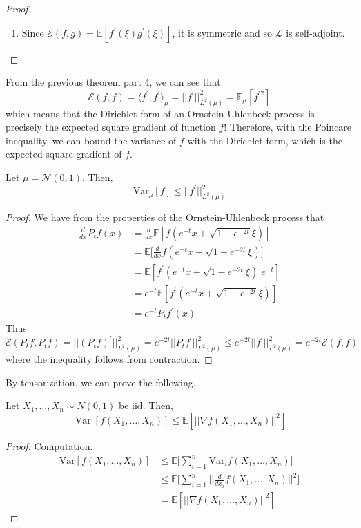 \documentclass{article}
\DeclareMathOperator{\Var}{Var}
\begin{document}
\begin{proof}
\begin{enumerate}
      \item Since $\mathcal{E}(f, g) = \mathbb{E}[f^\prime(\xi) g^\prime (\xi)]$, it is symmetric and so $\mathscr{L}$ is self-adjoint. 
  \end{enumerate}

  \end{proof}

  From the previous theorem part 4, we can see that 
  \[\mathcal{E}(f, f) = \langle f^\prime, f^\prime \rangle_\mu = ||f^\prime||_{L^2(\mu)}^2 = \mathbb{E}_\mu[ f^{\prime 2} ]\]
  which means that the Dirichlet form of an Ornstein-Uhlenbeck process is precisely the expected square gradient of function $f$! Therefore, with the Poincare inequality, we can bound the variance of $f$ with the Dirichlet form, which is the expected square gradient of $f$. 

  \begin{theorem}
  Let $\mu = \mathcal{N}(0, 1)$. Then, 
  \[\mathrm{Var}_\mu [f] \leq ||f^\prime||_{L^2(\mu)}^2\]
  \end{theorem}
  \begin{proof}
  We have from the properties of the Ornstein-Uhlenbeck process that
  \begin{align*}
      \frac{d}{dx} P_t f(x) & = \frac{d}{dx} \mathbb{E}[ f(e^{-t} x + \sqrt{1 - e^{-2t}} \xi)] \\
      & = \mathbb{E} \bigg[ \frac{d}{dx} f(e^{-t} x + \sqrt{1 - e^{-2t}} \xi)] \\
      & = \mathbb{E}[f^\prime (e^{-t} x + \sqrt{1 - e^{-2t}} \xi) \; e^{-t}] \\
      & = e^{-t} \mathbb{E}[f^\prime (e^{-t} x + \sqrt{1 - e^{-2t}} \xi)] \\
      & = e^{-t} P_t f^\prime (x) 
  \end{align*}
  Thus
  \[\mathcal{E}(P_t f, P_t f) = ||(P_t f)^\prime||_{L^2 (\mu)}^2 = e^{-2t} || P_t f^\prime ||^2_{L^2(\mu)} \leq e^{-2t} ||f^\prime||^2_{L^2(\mu)} = e^{-2t} \mathcal{E}(f, f) \]
  where the inequality follows from contraction. 
  \end{proof}

  By tensorization, we can prove the following. 

  \begin{corollary}
  Let $X_1, \ldots, X_n \sim N(0, 1)$ be iid. Then, 
  \[\Var[ f(X_1, \ldots, X_n)] \leq \mathbb{E}[ || \nabla f (X_1, \ldots, X_n)||^2 ]\]
  \end{corollary}
  \begin{proof}
  Computation. 
  \begin{align*}
      \mathrm{Var}[f(X_1, \ldots, X_n)] & \leq \mathbb{E} \bigg[ \sum_{i=1}^n \mathrm{Var}_i f(X_1, \ldots, X_n) \bigg] \\
      & \leq \mathbb{E} \bigg[ \sum_{i=1}^n \bigg| \bigg| \frac{d}{dx_i} f(X_1, \ldots, X_n)\bigg|\bigg|^2 \bigg] \\
      & = \mathbb{E}[ ||\nabla f (X_1, \ldots, X_n) ||^2 ]
  \end{align*}
  \end{proof}
\end{document}
